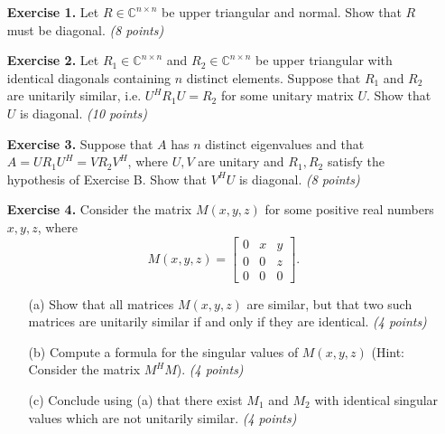 \documentclass[14pt]{report}
\begin{document}
\begin{enumerate}
  \item[\textbf{Exercise 1.}] Let $R\in\mathbb{C}^{n\times n}$ be upper triangular and normal. Show that $R$ must be  diagonal. \textit{(8 points)}


\vspace{1cm}



  \item[\textbf{Exercise 2.}] Let $R_1\in\mathbb{C}^{n\times n}$ and
    $R_2\in\mathbb{C}^{n\times n}$ be upper triangular with identical diagonals
    containing $n$ distinct elements. Suppose that $R_1$ and $R_2$ are 
    unitarily similar, i.e. $U^HR_1U = R_2$ for some unitary matrix $U$.
    Show that $U$ is diagonal. \textit{(10 points)}



\vspace{1cm}

  \item[\textbf{Exercise 3.}] Suppose that $A$ has $n$ distinct eigenvalues and
    that $A = U R_1 U^H = V R_2 V^H$, where $U,V$ are unitary and $R_1, R_2$ satisfy the hypothesis of Exercise B. Show that $V^H U$ is
    diagonal. \textit{(8 points)}


\vspace{1cm}


  \item[\textbf{Exercise 4.}] Consider the matrix $M(x,y,z)$ for some positive
    real numbers $x,y,z$, where
  \[M(x,y,z)=\left[\begin{array}{ccc}0&x&y\\0&0&z\\0&0&0\end{array}\right].\]
    \begin{enumerate}
      \item[(a)] Show that all matrices $M(x,y,z)$ are similar, but that two
         such matrices are unitarily similar if and only if they are identical. \textit{(4 points)}


\vspace{1cm}

      \item[(b)] Compute a formula for the singular values of $M(x,y,z)$ (Hint: Consider the matrix $M^H M$). \linebreak\textit{(4 points)}
      \item[(c)] Conclude using (a) that there exist $M_1$ and $M_2$ with
        identical singular values which are not unitarily similar. \textit{(4 points)} 
      \end{enumerate}
 

\end{enumerate}
\end{document}
